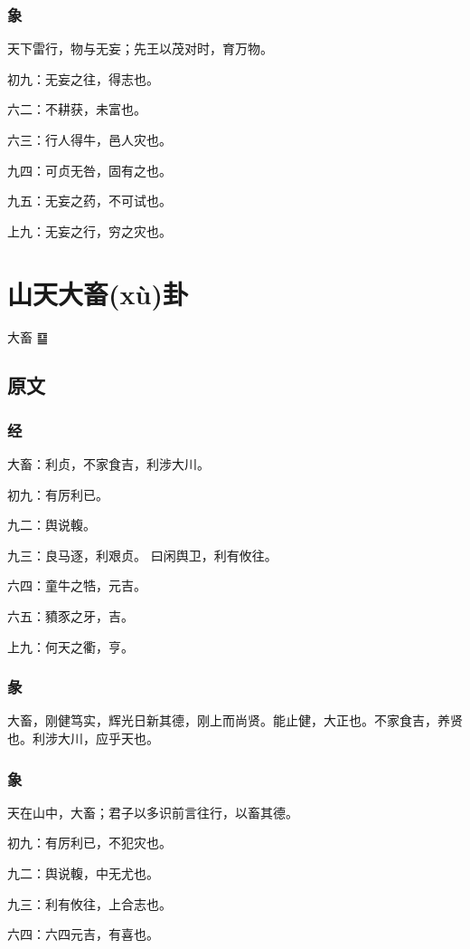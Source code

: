 \documentclass[12pt,oneside]{book}
\begin{document}
\subsection{象}
天下雷行，物与无妄；先王以茂对时，育万物。

初九：无妄之往，得志也。

六二：不耕获，未富也。

六三：行人得牛，邑人灾也。

九四：可贞无咎，固有之也。

九五：无妄之药，不可试也。

上九：无妄之行，穷之灾也。

\chapter{山天大畜(xù)卦}
大畜 {\Large ䷙}

\section{原文}

\subsection{经}
大畜：利贞，不家食吉，利涉大川。

初九：有厉利已。

九二：舆说輹。

九三：良马逐，利艰贞。 曰闲舆卫，利有攸往。

六四：童牛之牿，元吉。

六五：豶豕之牙，吉。

上九：何天之衢，亨。

\subsection{彖}
大畜，刚健笃实，辉光日新其德，刚上而尚贤。能止健，大正也。不家食吉，养贤也。利涉大川，应乎天也。

\subsection{象}
天在山中，大畜；君子以多识前言往行，以畜其德。

初九：有厉利已，不犯灾也。

九二：舆说輹，中无尤也。

九三：利有攸往，上合志也。

六四：六四元吉，有喜也。
\end{document}

